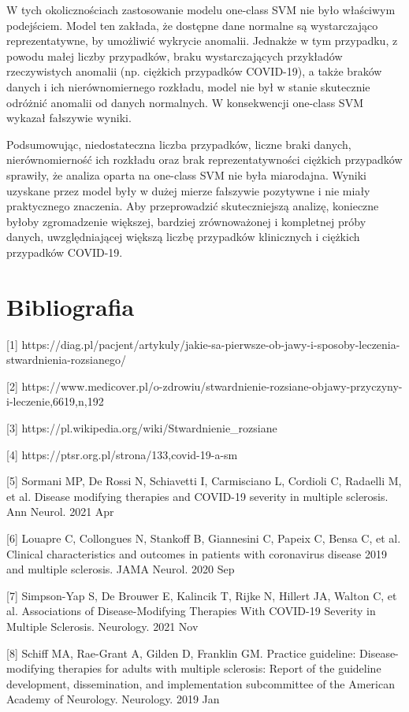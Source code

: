 \documentclass[a4paper,fleqn]{cas-dc}
\begin{document}
W tych okolicznościach zastosowanie modelu one-class SVM nie było właściwym podejściem. Model ten zakłada, że dostępne dane normalne są wystarczająco reprezentatywne, by umożliwić wykrycie anomalii. Jednakże w tym przypadku, z powodu małej liczby przypadków, braku wystarczających przykładów rzeczywistych anomalii (np. ciężkich przypadków COVID-19), a także braków danych i ich nierównomiernego rozkładu, model nie był w stanie skutecznie odróżnić anomalii od danych normalnych. W konsekwencji one-class SVM wykazał fałszywie wyniki.

Podsumowując, niedostateczna liczba przypadków, liczne braki danych, nierównomierność ich rozkładu oraz brak reprezentatywności ciężkich przypadków sprawiły, że analiza oparta na one-class SVM nie była miarodajna. Wyniki uzyskane przez model były w dużej mierze fałszywie pozytywne i nie miały praktycznego znaczenia. Aby przeprowadzić skuteczniejszą analizę, konieczne byłoby zgromadzenie większej, bardziej zrównoważonej i kompletnej próby danych, uwzględniającej większą liczbę przypadków klinicznych i ciężkich przypadków COVID-19.

\section{Bibliografia}

[1] https://diag.pl/pacjent/artykuly/jakie-sa-pierwsze-ob-jawy-i-sposoby-leczenia-stwardnienia-rozsianego/

[2] https://www.medicover.pl/o-zdrowiu/stwardnienie-rozsiane-objawy-przyczyny-i-leczenie,6619,n,192

[3] https://pl.wikipedia.org/wiki/Stwardnienie\_rozsiane

[4] https://ptsr.org.pl/strona/133,covid-19-a-sm

[5] Sormani MP, De Rossi N, Schiavetti I, Carmisciano L, Cordioli C, Radaelli M, et al. Disease modifying therapies and COVID-19 severity in multiple sclerosis. Ann Neurol. 2021 Apr

[6] Louapre C, Collongues N, Stankoff B, Giannesini C, Papeix C, Bensa C, et al. Clinical characteristics and outcomes in patients with coronavirus disease 2019 and multiple sclerosis. JAMA Neurol. 2020 Sep

[7] Simpson-Yap S, De Brouwer E, Kalincik T, Rijke N, Hillert JA, Walton C, et al. Associations of Disease-Modifying Therapies With COVID-19 Severity in Multiple Sclerosis. Neurology. 2021 Nov

[8] Schiff MA, Rae-Grant A, Gilden D, Franklin GM. Practice guideline: Disease-modifying therapies for adults with multiple sclerosis: Report of the guideline development, dissemination, and implementation subcommittee of the American Academy of Neurology. Neurology. 2019 Jan
\end{document}
